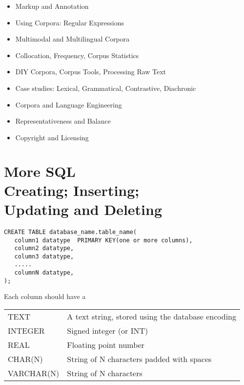 \documentclass[a4paper,landscape,headrule,footrule,xetex]{foils}
\begin{document}

\maketitle



\begin{itemize} \addtolength{\itemsep}{-0.3\itemsep}
\item Markup and Annotation 
\item Using Corpora: Regular Expressions
\item Multimodal and Multilingual Corpora 
\item Collocation, Frequency, Corpus Statistics 
\item DIY Corpora, Corpus Tools, Processing Raw Text 
\item Case studies: Lexical, Grammatical, Contrastive, Diachronic
\item Corpora and Language Engineering 
\item Representativeness and Balance
\item Copyright and Licensing
\end{itemize}




\section{More SQL \\ Creating; Inserting; \\ Updating and Deleting}

\begin{verbatim}
CREATE TABLE database_name.table_name(
   column1 datatype  PRIMARY KEY(one or more columns),
   column2 datatype,
   column3 datatype,
   .....
   columnN datatype,
);
\end{verbatim}

Each column should have a 

\begin{tabular}{ll}
  TEXT & 	A text string, stored using the database encoding\\
  INTEGER	& Signed integer (or INT)\\
  REAL	& Floating point number \\
  CHAR(N)  & String of N characters padded with spaces \\
  VARCHAR(N)  & String of N characters
\end{tabular}
\end{document}
